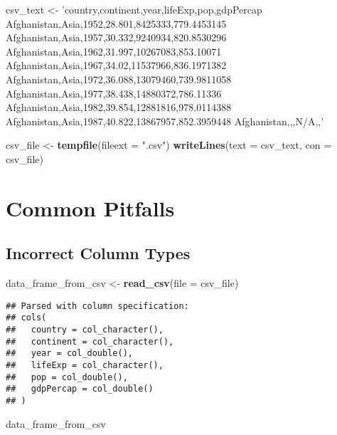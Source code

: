 \documentclass[
]{book}
\newenvironment{Shaded}{\begin{snugshade}}{\end{snugshade}}
\newcommand{\DataTypeTok}[1]{\textcolor[rgb]{0.13,0.29,0.53}{#1}}
\newcommand{\KeywordTok}[1]{\textcolor[rgb]{0.13,0.29,0.53}{\textbf{#1}}}
\newcommand{\NormalTok}[1]{#1}
\newcommand{\StringTok}[1]{\textcolor[rgb]{0.31,0.60,0.02}{#1}}
\begin{document}
\begin{Shaded}
\begin{Highlighting}[]
\NormalTok{csv_text <-}\StringTok{ }
\StringTok{'country,continent,year,lifeExp,pop,gdpPercap}
\StringTok{Afghanistan,Asia,1952,28.801,8425333,779.4453145}
\StringTok{Afghanistan,Asia,1957,30.332,9240934,820.8530296}
\StringTok{Afghanistan,Asia,1962,31.997,10267083,853.10071}
\StringTok{Afghanistan,Asia,1967,34.02,11537966,836.1971382}
\StringTok{Afghanistan,Asia,1972,36.088,13079460,739.9811058}
\StringTok{Afghanistan,Asia,1977,38.438,14880372,786.11336}
\StringTok{Afghanistan,Asia,1982,39.854,12881816,978.0114388}
\StringTok{Afghanistan,Asia,1987,40.822,13867957,852.3959448}
\StringTok{Afghanistan,,,N/A,,'}

\NormalTok{csv_file <-}\StringTok{ }\KeywordTok{tempfile}\NormalTok{(}\DataTypeTok{fileext =} \StringTok{".csv"}\NormalTok{)}
\KeywordTok{writeLines}\NormalTok{(}\DataTypeTok{text =}\NormalTok{ csv_text, }\DataTypeTok{con =}\NormalTok{ csv_file)}
\end{Highlighting}
\end{Shaded}

\hypertarget{common-pitfalls}{%
\section{Common Pitfalls}\label{common-pitfalls}}

\hypertarget{incorrect-column-types}{%
\subsection{Incorrect Column Types}\label{incorrect-column-types}}

\begin{Shaded}
\begin{Highlighting}[]
\NormalTok{data_frame_from_csv <-}\StringTok{ }\KeywordTok{read_csv}\NormalTok{(}\DataTypeTok{file =}\NormalTok{ csv_file)}
\end{Highlighting}
\end{Shaded}

\begin{verbatim}
## Parsed with column specification:
## cols(
##   country = col_character(),
##   continent = col_character(),
##   year = col_double(),
##   lifeExp = col_character(),
##   pop = col_double(),
##   gdpPercap = col_double()
## )
\end{verbatim}

\begin{Shaded}
\begin{Highlighting}[]
\NormalTok{data_frame_from_csv}
\end{Highlighting}
\end{Shaded}
\end{document}
